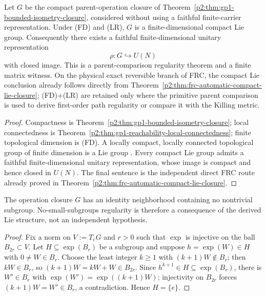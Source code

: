 \documentclass[11pt,a4paper]{article}
\begin{document}
\begin{theorem}
\label{p2:thm:finite-mode-lie-regularity}
Let \(G\) be the compact parent-operation closure of
Theorem~\ref{p2:thm:gp1-bounded-isometry-closure}, considered without using a
faithful finite-carrier representation.  Under (FD) and (LR), \(G\) is a
finite-dimensional compact Lie group.  Consequently there exists a faithful
finite-dimensional unitary representation
\[
 \rho:G\hookrightarrow U(N)
\]
with closed image.  This is a parent-comparison regularity theorem and a
finite matrix witness.  On the physical exact reversible branch of FRC, the
compact Lie conclusion already follows directly from
Theorem~\ref{p2:thm:frc-automatic-compact-lie-closure}; (FD)+(LR) are retained
only where the primitive parent comparison is used to derive first-order path
regularity or compare it with the Killing metric.
\end{theorem}

\begin{proof}
Compactness is Theorem~\ref{p2:thm:gp1-bounded-isometry-closure}; local
connectedness is
Theorem~\ref{p2:thm:gp1-reachability-local-connectedness}; finite
topological dimension is (FD).  A locally compact, locally connected
topological group of finite dimension is a Lie group
\cite[p.~185]{MontgomeryZippin1955}.  Every compact Lie group admits a faithful
finite-dimensional unitary representation, whose image is compact and hence
closed in \(U(N)\).  The final sentence is the independent direct FRC route
already proved in Theorem~\ref{p2:thm:frc-automatic-compact-lie-closure}.
\end{proof}

\begin{corollary}
\label{p2:cor:nss-derived}
The operation closure \(G\) has an identity neighborhood containing no
nontrivial subgroup.  No-small-subgroups regularity is therefore a
consequence of the derived Lie structure, not an independent hypothesis.
\end{corollary}

\begin{proof}
Fix a norm on \(V:=T_eG\) and \(r>0\) such that \(\exp\) is injective on
the ball \(B_{2r}\subset V\).  Let \(H\subseteq\exp(B_r)\) be a subgroup
and suppose \(h=\exp(W)\in H\) with \(0\ne W\in B_r\).  Choose the least
integer \(k\ge1\) with \((k+1)W\notin B_r\); then \(kW\in B_r\), so
\((k+1)W=kW+W\in B_{2r}\).  Since \(h^{k+1}\in H\subseteq\exp(B_r)\),
there is \(W'\in B_r\) with \(\exp(W')=\exp((k+1)W)\); injectivity on
\(B_{2r}\) forces \((k+1)W=W'\in B_r\), a contradiction.  Hence
\(H=\{e\}\).
\end{proof}
\end{document}
